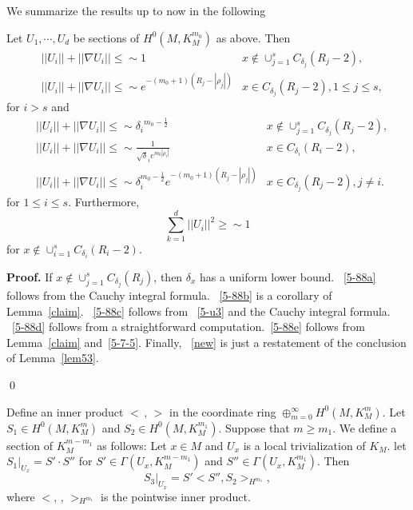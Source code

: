 We summarize the results up to now in the following
\begin{prop}\label{prop51}
Let $U_1,\cdots, U_d$ be sections of $H^0(M,K_M^{m_0})$
as above. Then
\begin{align}
&||U_i||+||\nabla U_i||\leq\sim 1 &x\notin
\cup_{j=1}^sC_{\delta_j}(R_j-2),
\label{5-88a}\\
&||U_i||+||\nabla U_i||\leq\sim
e^{-(m_0+1)(R_j-|\rho_j|)}
&x\in C_{\delta_j}(R_j-2), 1\leq j\leq s, \label{5-88b}
\end{align}
for $i>s$ and
\begin{align}
&||U_i||+||\nabla U_i||\leq\sim
{\delta_i}^{m_0-\frac 12}
&x\notin\cup_{j=1}^s C_{\delta_j}(R_j-2),\label{5-88c}\\
&||U_i||+||\nabla U_i||\leq\sim
\frac{1}{\sqrt\delta_i e^{m_0|\rho_i|}}
&x\in C_{\delta_i}(R_i-2),\label{5-88d}\\
&||U_i||+||\nabla U_i||\leq\sim\delta_i^{m_0-\frac 12}
e^{-(m_0+1)(R_j-|\rho_j|)} &
x\in C_{\delta_j}(R_j-2), j\neq i.\label{5-88e}
\end{align}
for $1\leq i\leq s$.
Furthermore, 
\begin{equation}\label{new}
\sum_{k=1}^d||U_i||^2\geq\sim 1
\end{equation}
for $x\notin \cup_{i=1}^s C_{\delta_i}(R_i-2)$.
\end{prop}

{\bf Proof.}  If $x\notin \cup_{j=1}^sC_{\delta_j}(R_j)$, then $\delta_x$
has a uniform lower bound.
~\eqref{5-88a} follows from the Cauchy integral formula. ~\eqref{5-88b}
is a corollary of Lemma~\ref{claim}. ~\eqref{5-88c} follows from
~\eqref{5-u3} and the Cauchy integral formula. ~\eqref{5-88d} follows
from
a straightforward computation.~\eqref{5-88e} follows from
Lemma~\ref{claim} and~\eqref{5-7-5}. Finally, ~\eqref{new} is just a
restatement of the conclusion of Lemma~\ref{lem53}.

\qed



Define an inner product $<\,,\,>$ in the coordinate ring $\oplus_{m=0}^
\infty H^0(M,K_M^m)$. Let $S_1\in H^0(M,K_M^m)$ and $S_2\in
H^0(M,K_M^{m_1})$. Suppose that $m\ge m_1$. We define a section of
$K_M^{m-m_1}$ as follows: Let $x\in M$ and $U_x$ is a local trivialization
of 
$K_M$. let $S_1|_{U_x}=S'\cdot S''$ for 
$S'\in \Gamma(U_x, K_M^{m-m_1})$ and $S''\in
\Gamma(U_x, K_M^{m_1})$. Then
\[
S_3|_{U_x}=S'<S'', S_2>_{H^{m_1}},
\]
where $<,\,,\,>_{H^{m_1}}$ is the pointwise inner product.


